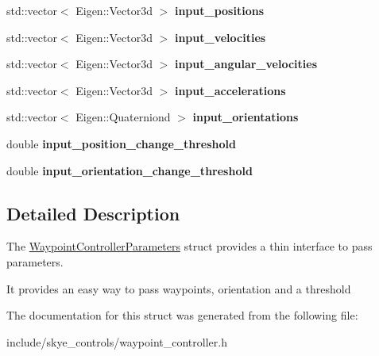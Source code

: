 \begin{DoxyCompactItemize}
\item 
\hypertarget{struct_waypoint_controller_parameters_a9973356999f28d953794a8622db68add}{std\-::vector$<$ Eigen\-::\-Vector3d $>$ {\bfseries input\-\_\-positions}}\label{struct_waypoint_controller_parameters_a9973356999f28d953794a8622db68add}

\item 
\hypertarget{struct_waypoint_controller_parameters_a786e90383d90c092f20d8eeb71a3c2a1}{std\-::vector$<$ Eigen\-::\-Vector3d $>$ {\bfseries input\-\_\-velocities}}\label{struct_waypoint_controller_parameters_a786e90383d90c092f20d8eeb71a3c2a1}

\item 
\hypertarget{struct_waypoint_controller_parameters_a109ec854274872991ee481deac9ce272}{std\-::vector$<$ Eigen\-::\-Vector3d $>$ {\bfseries input\-\_\-angular\-\_\-velocities}}\label{struct_waypoint_controller_parameters_a109ec854274872991ee481deac9ce272}

\item 
\hypertarget{struct_waypoint_controller_parameters_a2051816d1476c0460e0d949c6f4321aa}{std\-::vector$<$ Eigen\-::\-Vector3d $>$ {\bfseries input\-\_\-accelerations}}\label{struct_waypoint_controller_parameters_a2051816d1476c0460e0d949c6f4321aa}

\item 
\hypertarget{struct_waypoint_controller_parameters_a1d07718cf75a62d9e1e7d733620fe980}{std\-::vector$<$ Eigen\-::\-Quaterniond $>$ {\bfseries input\-\_\-orientations}}\label{struct_waypoint_controller_parameters_a1d07718cf75a62d9e1e7d733620fe980}

\item 
\hypertarget{struct_waypoint_controller_parameters_a42ae94383aa5f1b88fac227b9e30937e}{double {\bfseries input\-\_\-position\-\_\-change\-\_\-threshold}}\label{struct_waypoint_controller_parameters_a42ae94383aa5f1b88fac227b9e30937e}

\item 
\hypertarget{struct_waypoint_controller_parameters_a94c364c92d5c54d0a42c338978181b2f}{double {\bfseries input\-\_\-orientation\-\_\-change\-\_\-threshold}}\label{struct_waypoint_controller_parameters_a94c364c92d5c54d0a42c338978181b2f}

\end{DoxyCompactItemize}


\subsection{Detailed Description}
The \hyperlink{struct_waypoint_controller_parameters}{Waypoint\-Controller\-Parameters} struct provides a thin interface to pass parameters. 

It provides an easy way to pass waypoints, orientation and a threshold 

The documentation for this struct was generated from the following file\-:\begin{DoxyCompactItemize}
\item 
include/skye\-\_\-controls/waypoint\-\_\-controller.\-h\end{DoxyCompactItemize}
